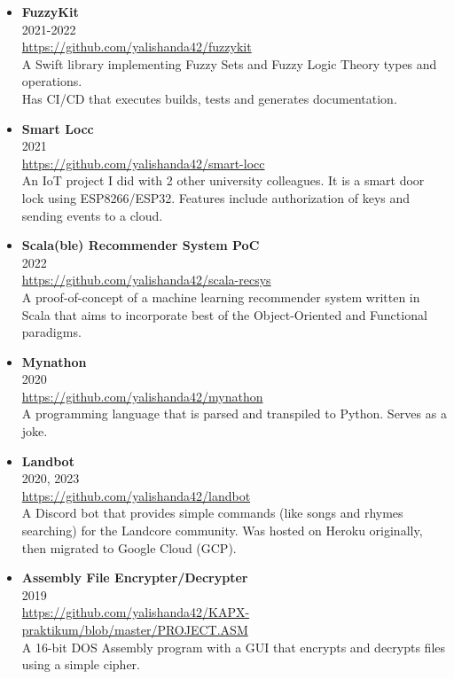 \documentclass[11pt,a4paper]{article}
\begin{document}
\begin{itemize}[leftmargin=*]
    \item \textbf{FuzzyKit} \\
    2021-2022 \\
    \href{https://github.com/yalishanda42/fuzzykit}{https://github.com/yalishanda42/fuzzykit} \\
    A Swift library implementing Fuzzy Sets and Fuzzy Logic Theory types and operations. \\
    Has CI/CD that executes builds, tests and generates documentation.
    
    \item \textbf{Smart Locc} \\
    2021 \\
    \href{https://github.com/yalishanda42/smart-locc}{https://github.com/yalishanda42/smart-locc} \\
    An IoT project I did with 2 other university colleagues. It is a smart door lock using ESP8266/ESP32.
    Features include authorization of keys and sending events to a cloud.

    \item \textbf{Scala(ble) Recommender System PoC} \\
    2022 \\
    \href{https://github.com/yalishanda42/scala-recsys}{https://github.com/yalishanda42/scala-recsys} \\
    A proof-of-concept of a machine learning recommender system written in Scala that aims to incorporate
    best of the Object-Oriented and Functional paradigms. 

    \item \textbf{Mynathon} \\
    2020 \\
    \href{https://github.com/yalishanda42/mynathon}{https://github.com/yalishanda42/mynathon} \\
    A programming language that is parsed and transpiled to Python. Serves as a joke.

    \item \textbf{Landbot} \\
    2020, 2023 \\
    \href{https://github.com/yalishanda42/landbot}{https://github.com/yalishanda42/landbot} \\
    A Discord bot that provides simple commands (like songs and rhymes searching) for the Landcore community. 
    Was hosted on Heroku originally, then migrated to Google Cloud (GCP).

    \item \textbf{Assembly File Encrypter/Decrypter} \\
    2019 \\
    \href{https://github.com/yalishanda42/KAPX-praktikum/blob/master/PROJECT.ASM}{https://github.com/yalishanda42/KAPX-praktikum/blob/master/PROJECT.ASM} \\
    A 16-bit DOS Assembly program with a GUI that encrypts and decrypts files using a simple cipher.

\end{itemize}
\end{document}

